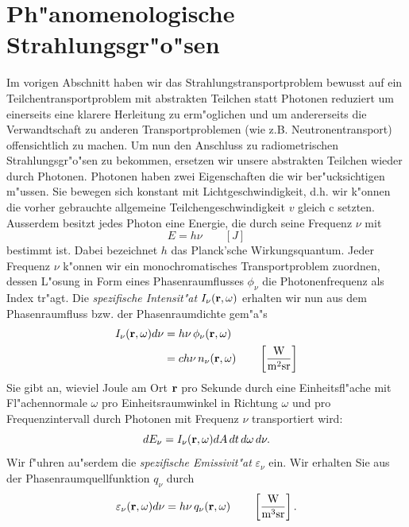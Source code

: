 	\section{Ph"anomenologische Strahlungsgr"o"sen}\label{subsec:strahlungsgroessen}
	Im vorigen Abschnitt haben wir das Strahlungstransportproblem bewusst auf ein Teilchentransportproblem mit abstrakten Teilchen statt Photonen reduziert um einerseits eine klarere Herleitung zu erm"oglichen und um andererseits die Verwandtschaft zu anderen Transportproblemen (wie z.B. Neutronentransport) offensichtlich zu machen. Um nun den Anschluss zu radiometrischen Strahlungsgr"o"sen zu bekommen, ersetzen wir unsere abstrakten Teilchen wieder durch Photonen. Photonen haben zwei Eigenschaften die wir ber"ucksichtigen m"ussen. Sie bewegen sich konstant mit Lichtgeschwindigkeit, d.h. wir k"onnen die vorher gebrauchte allgemeine Teilchengeschwindigkeit $v$ gleich $\text{c}$ setzten. Ausserdem besitzt jedes Photon eine Energie, die durch seine Frequenz $\nu$ mit 
	$$E=h\nu \qquad[J]$$
	bestimmt ist. Dabei bezeichnet $h$ das Planck'sche Wirkungsquantum.
	Jeder Frequenz $\nu$ k"onnen wir ein monochromatisches Transportproblem zuordnen, dessen L"osung in Form eines Phasenraumflusses $\phi_\nu$ die Photonenfrequenz als Index tr"agt.
	Die {\em spezifische Intensit"at} $I_\nu(\mathbf{r},\omega)$ erhalten wir nun aus dem Phasenraumfluss bzw. der Phasenraumdichte gem"a"s
	\begin{align}\label{eq:intensity_def}
		I_\nu(\mathbf{r},\omega)d\nu & = h\nu\,\phi_\nu(\mathbf{r},\omega)\\
		                       & = c h\nu\,n_\nu(\mathbf{r},\omega) \qquad \left[\frac{\text{W}}{\text{m}^2\text{sr}}\right] \nonumber
	\end{align}
	Sie gibt an, wieviel Joule am Ort $\mathbf{r}$ pro Sekunde durch eine Einheitsfl"ache mit Fl"achennormale $\omega$ pro Einheitsraumwinkel in Richtung $\omega$ und pro Frequenzintervall durch Photonen mit Frequenz $\nu$ transportiert wird:
	$$dE_\nu=I_\nu(\mathbf{r},\omega) dA\,dt\,d\omega\,d\nu.$$
	Wir f"uhren au"serdem die {\em spezifische Emissivit"at} $\varepsilon_\nu$ ein. Wir erhalten Sie aus der Phasenraumquellfunktion $q_\nu$ durch
	\begin{equation}\label{eq:emissivity_def}
		\varepsilon_\nu(\mathbf{r},\omega)d\nu = h\nu\,q_\nu(\mathbf{r},\omega) \qquad \left[\frac{\text{W}}{\text{m}^3\text{sr}}\right].
	\end{equation}
	
